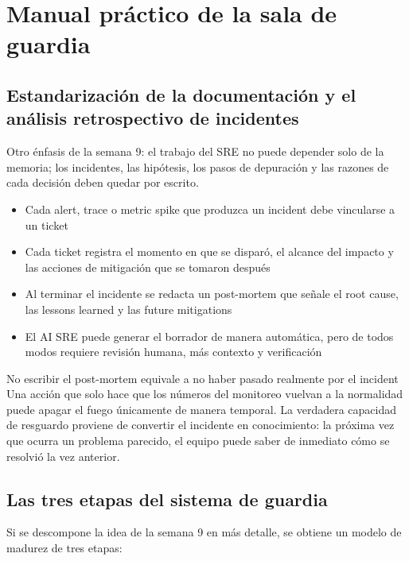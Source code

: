 \section{Manual práctico de la sala de guardia}

\subsection{Estandarización de la documentación y el análisis retrospectivo de incidentes}

Otro énfasis de la semana 9: el trabajo del SRE no puede depender solo de la memoria; los incidentes, las hipótesis, los pasos de depuración y las razones de cada decisión deben quedar por escrito.

\begin{itemize}
    \item Cada alert, trace o metric spike que produzca un incident debe vincularse a un ticket
    \item Cada ticket registra el momento en que se disparó, el alcance del impacto y las acciones de mitigación que se tomaron después
    \item Al terminar el incidente se redacta un post-mortem que señale el root cause, las lessons learned y las future mitigations
    \item El AI SRE puede generar el borrador de manera automática, pero de todos modos requiere revisión humana, más contexto y verificación
\end{itemize}

\begin{warningbox}{No escribir el post-mortem equivale a no haber pasado realmente por el incident}
Una acción que solo hace que los números del monitoreo vuelvan a la normalidad puede apagar el fuego únicamente de manera temporal. La verdadera capacidad de resguardo proviene de convertir el incidente en conocimiento: la próxima vez que ocurra un problema parecido, el equipo puede saber de inmediato cómo se resolvió la vez anterior.
\end{warningbox}

\subsection{Las tres etapas del sistema de guardia}

Si se descompone la idea de la semana 9 en más detalle, se obtiene un modelo de madurez de tres etapas:

